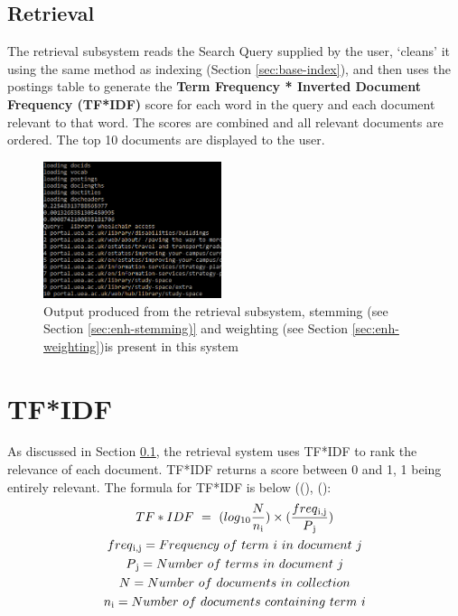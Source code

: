 \documentclass{sig-alternate}
\begin{document}
		\subsection{Retrieval} \label{sec:base-retrieval}
		The retrieval subsystem reads the Search Query supplied by the user, `cleans' it using the same method as indexing (Section \ref{sec:base-index}), and then uses the postings table to generate the \textbf{Term Frequency * Inverted Document Frequency (TF*IDF)} score for each word in the query and each document relevant to that word. The scores are combined and all relevant documents are ordered. The top 10 documents are displayed to the user. 
		
	\begin{figure}
		\includegraphics[width=1\linewidth, height=4cm,]{retrieverOuput.PNG}
		\caption{Output produced from the retrieval subsystem, stemming (see Section \ref{sec:enh-stemming)} and weighting (see Section \ref{sec:enh-weighting})is present in this system}
		\label{fig:retriever-output}
	\end{figure}
		
	\section{TF*IDF} \label{sec:TFIDF}
	As discussed in Section \ref{sec:base-retrieval}, the retrieval system uses TF*IDF to rank the relevance of each document. TF*IDF returns a score between 0 and 1, 1 being entirely relevant. The formula for TF*IDF is below ((\cite{modernIR}), (\cite{IntroIR}):
	\begin{gather*}
		TF*IDF \ = \ (log\textsubscript{10}\frac{N}{n\textsubscript{i}}) \times (\frac{freq\textsubscript{i,j}}{P\textsubscript{j}}) \\
		freq\textsubscript{i,j} = Frequency \ of \ term \ i \ in \ document \ j \\
		P\textsubscript{j} = Number \ of \ terms \ in \ document \ j \\
		N = Number \ of \ documents \ in \ collection \\
		n\textsubscript{i} = Number \ of \ documents \ containing \ term \ i
	\end{gather*}
	
\end{document}
